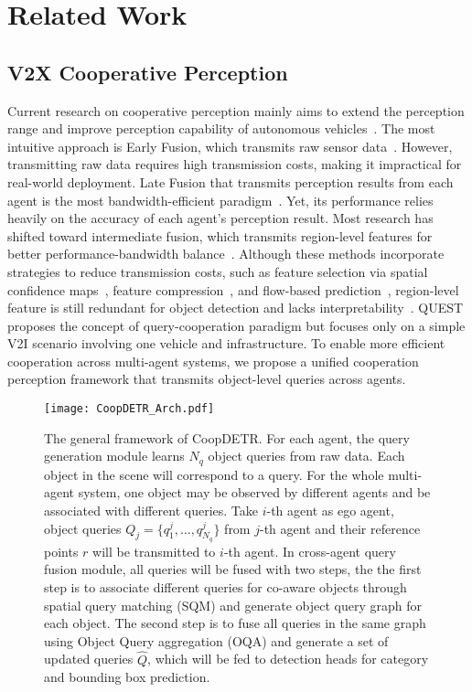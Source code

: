 \section{Related Work}
\subsection{V2X Cooperative Perception}

Current research on cooperative perception mainly aims to extend the perception range and improve perception capability of autonomous vehicles~\cite {wang2024emiff,han2023collaborative}. The most intuitive approach is Early Fusion, which transmits raw sensor data~\cite{chen2019cooper,chen2022co3}. However, transmitting raw data requires high transmission costs, making it impractical for real-world deployment. Late Fusion that transmits perception results from each agent is the most bandwidth-efficient paradigm~\cite{chen2022model-agnostic,yu2022dairv2x}. Yet, its performance relies heavily on the accuracy of each agent's perception result. Most research has shifted toward intermediate fusion, which transmits region-level features for better performance-bandwidth balance~\cite{xu2022opv2v,mehr2019disconet,xu2022v2xvit,hu2022where2comm,xu2022cobevt,wang2020v2vnet,yu2023ffnet,cui2022coopernaut,hu2023coca3d,wang2024emiff,wei2023cobevflow}. Although these methods incorporate strategies to reduce transmission costs, such as feature selection via spatial confidence maps~\cite{hu2022where2comm}, feature compression~\cite{xu2022opv2v,xu2022v2xvit,wang2024emiff}, and flow-based prediction~\cite{yu2023ffnet,wei2023cobevflow}, region-level feature is still redundant for object detection and lacks interpretability~\cite{fan2023quest}. QUEST \cite{fan2023quest} proposes the concept of query-cooperation paradigm but focuses only on a simple V2I scenario involving one vehicle and infrastructure.  To enable more efficient cooperation across multi-agent systems, we propose a unified cooperation perception framework that transmits object-level queries across agents.


\begin{figure*}[t]
	\centering  
	\texttt{[image: CoopDETR\_Arch.pdf]} 
	\caption{The general framework of CoopDETR. For each agent, the query generation module learns $N_q$ object queries from raw data. Each object in the scene will correspond to a query. For the whole multi-agent system, one object may be observed by different agents and be associated with different queries. Take $i$-th agent as ego agent, object queries $Q_{j} = \{q^{j}_{1},\dots,q^{j}_{N_q}\}$ from $j$-th agent and their reference points $r$ will be transmitted to $i$-th agent. In cross-agent query fusion module, all queries will be fused with two steps, the 
 the first step is to associate different queries for co-aware objects through spatial query matching (SQM) and generate object query graph for each object. The second step is to fuse all queries in the same graph using Object Query aggregation (OQA) and generate a set of updated queries $\hat{Q}$, which will be fed to detection heads for category and bounding box prediction. }  
	\label{fig:framework}   
\end{figure*}

